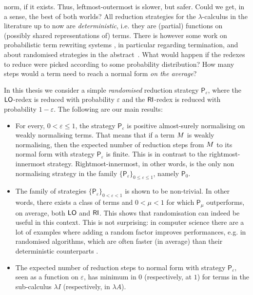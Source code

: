 norm, if it exists. Thus, leftmost-outermost is slower, but
safer. Could we get, in a sense, the best of both worlds?  All
reduction strategies for the $\lambda$-calculus in the literature up
to now are \emph{deterministic}, i.e. they are (partial) functions on
(possibly shared representations of) terms. There is however some work on probabilistic term
rewriting systems
\cite{bournez_proving_2005,ferrer_fioriti_probabilistic_2015,avanzini_probabilistic_2018},
in particular regarding termination, and about randomised strategies
in the abstract~\cite{bournez_probabilistic_2002}. What would
happen if the redexes to reduce were picked according to some
probability distribution? How many steps would a term need to reach a
normal form \emph{on the average}?

In this thesis we consider a simple \emph{randomised}
reduction strategy $\mathsf{P}_\varepsilon$, where the $\textsf{LO}$-redex
is reduced with probability $\varepsilon$ and the $\textsf{RI}$-redex is
reduced with probability $1-\varepsilon$. The following are our main results:
\begin{itemize}
	\item
	For every, $0<\varepsilon\leq 1$, the strategy
	$\mathsf{P}_\varepsilon$ is positive almost-surely normalising on
	weakly normalising terms. That means that if a term $M$ is
	weakly normalising, then the expected number of reduction steps from
	$M$ to its normal form with strategy $\mathsf{P}_\varepsilon$
	is finite. This is in contrast to the rightmost-innermost strategy. Rightmost-innermost, in other
	words, is the only non normalising strategy in the family
	$\{\mathsf{P}_\varepsilon\}_{0\leq\varepsilon\leq 1}$, namely $\mathsf{P}_0$.
	\item
	The family of strategies
	$\{\mathsf{P}_\varepsilon\}_{0<\varepsilon<1}$ is shown to be
	non-trivial. In other words, there exists a class of terms and
	$0<\mu<1$ for which $\mathsf{P}_\mu$ outperforms, on average, both
	$\textsf{LO}$ and $\textsf{RI}$. This shows that randomisation can
	indeed be useful in this context. This is not surprising:
	in computer science there are a lot of examples where adding a random factor
	improves performances, e.g. in randomised algorithms, which are
	often faster (in average) than their deterministic counterparts
	\cite{motwani_randomized_1995}.
	\item
	The expected number of reduction steps to
	normal form with strategy $\mathsf{P}_\varepsilon$, seen as a function
	on $\varepsilon$, has minimum in $0$ (respectively, at $1$) for terms
	in the sub-calculus $\lambda I$ (respectively, in $\lambda A$).
\end{itemize}


